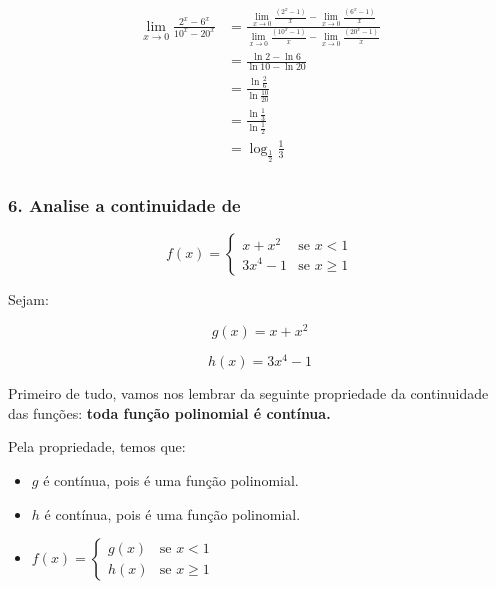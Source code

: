\documentclass{article}
\begin{document}
\begin{align*}
    \lim_{x \to 0} \frac{2^x - 6^x}{10^x - 20^x}
     & = \frac{  \lim_{x \to 0} \frac{(2^x -1)}{x} -  \lim_{x \to 0} \frac{(6^x - 1)}{x} }{ \lim_{x \to 0} \frac{(10^x -1)}{x} - \lim_{x \to 0} \frac{(20^x - 1)}{x} } \\
     & = \frac{  \ln 2 -  \ln 6 }{ \ln 10 - \ln 20 }                                                                                                                   \\
     & = \frac{  \ln \frac{2}{6} }{ \ln \frac{10}{20} }                                                                                                                \\
     & = \frac{  \ln \frac{1}{3} }{ \ln \frac{1}{2} }                                                                                                                  \\
     & = \log_{\frac{1}{2}} \frac{1}{3}                                                                                                                                \\
\end{align*}




\subsubsection*{6. Analise a continuidade de}

\begin{equation}
    f(x) =
    \left\{
    \begin{array}{ll}
        x + x^2  & \mbox{se } x < 1     \\
        3x^4 - 1 & \mbox{se } x \geq  1
    \end{array}
    \right.
\end{equation}

Sejam:

\[
    g(x) = x + x^2
\]

\[
    h(x) = 3x^4 - 1
\]

Primeiro de tudo, vamos nos lembrar da seguinte propriedade da continuidade das funções:
\textbf{toda função polinomial é contínua.}

Pela propriedade, temos que:

\begin{itemize}
    \item \(g\) é contínua, pois é uma função polinomial.
    \item \(h\) é contínua, pois é uma função polinomial.
    \item \(f(x) =
          \left\{
          \begin{array}{ll}
              g(x) & \mbox{se } x < 1     \\
              h(x) & \mbox{se } x \geq  1
          \end{array}
          \right.\)
\end{itemize}
\end{document}
